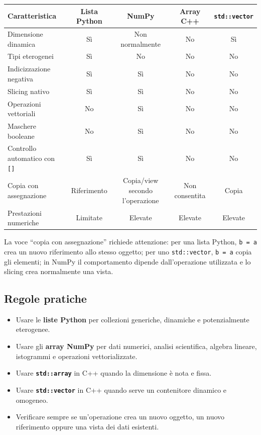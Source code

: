 \documentclass[11pt,a4paper]{book}
\begin{document}
\begin{center}
\small
\renewcommand{\arraystretch}{1.25}
\begin{tabular}{p{3.5cm}cccc}
\toprule
Caratteristica & Lista Python & NumPy & Array C++ & \texttt{std::vector} \\
\midrule
Dimensione dinamica & Sì & Non normalmente & No & Sì \\
Tipi eterogenei & Sì & No & No & No \\
Indicizzazione negativa & Sì & Sì & No & No \\
Slicing nativo & Sì & Sì & No & No \\
Operazioni vettoriali & No & Sì & No & No \\
Maschere booleane & No & Sì & No & No \\
Controllo automatico con \texttt{[]} & Sì & Sì & No & No \\
Copia con assegnazione & Riferimento & Copia/view secondo l'operazione & Non consentita & Copia \\
Prestazioni numeriche & Limitate & Elevate & Elevate & Elevate \\
\bottomrule
\end{tabular}
\end{center}

La voce ``copia con assegnazione'' richiede attenzione: per una lista Python, \texttt{b = a} crea un nuovo riferimento allo stesso oggetto; per uno \texttt{std::vector}, \texttt{b = a} copia gli elementi; in NumPy il comportamento dipende dall'operazione utilizzata e lo slicing crea normalmente una vista.

\subsection{Regole pratiche}

\begin{itemize}
    \item Usare le \textbf{liste Python} per collezioni generiche, dinamiche e potenzialmente eterogenee.
    \item Usare gli \textbf{array NumPy} per dati numerici, analisi scientifica, algebra lineare, istogrammi e operazioni vettorializzate.
    \item Usare \textbf{\texttt{std::array}} in C++ quando la dimensione è nota e fissa.
    \item Usare \textbf{\texttt{std::vector}} in C++ quando serve un contenitore dinamico e omogeneo.
    \item Verificare sempre se un'operazione crea un nuovo oggetto, un nuovo riferimento oppure una vista dei dati esistenti.
\end{itemize}
\end{document}
